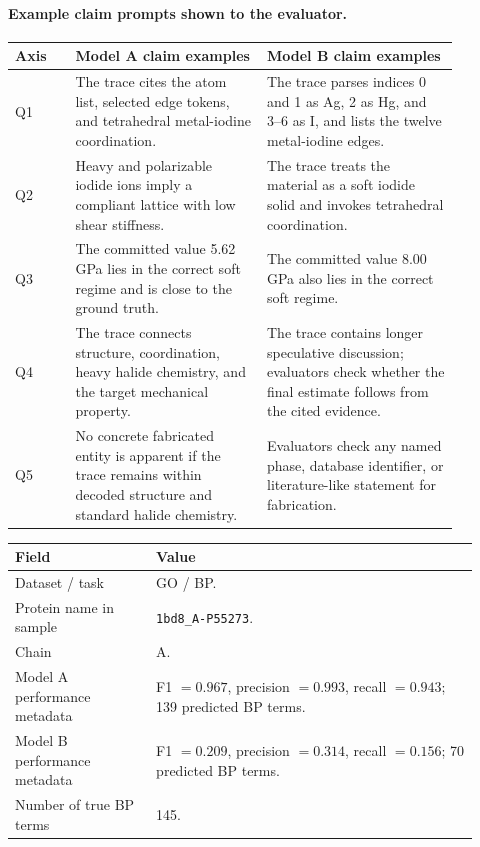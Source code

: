 \begin{appendices}
\paragraph{Example claim prompts shown to the evaluator.}
\begin{longtable}{P{0.12\linewidth}P{0.38\linewidth}P{0.38\linewidth}}
\toprule
\textbf{Axis} & \textbf{Model A claim examples} & \textbf{Model B claim examples} \\
\midrule
Q1 & The trace cites the atom list, selected edge tokens, and tetrahedral metal-iodine coordination. &
The trace parses indices 0 and 1 as Ag, 2 as Hg, and 3--6 as I, and lists the twelve metal-iodine edges. \\
Q2 & Heavy and polarizable iodide ions imply a compliant lattice with low shear stiffness. &
The trace treats the material as a soft iodide solid and invokes tetrahedral coordination. \\
Q3 & The committed value 5.62 GPa lies in the correct soft regime and is close to the ground truth. &
The committed value 8.00 GPa also lies in the correct soft regime. \\
Q4 & The trace connects structure, coordination, heavy halide chemistry, and the target mechanical property. &
The trace contains longer speculative discussion; evaluators check whether the final estimate follows from the cited evidence. \\
Q5 & No concrete fabricated entity is apparent if the trace remains within decoded structure and standard halide chemistry. &
Evaluators check any named phase, database identifier, or literature-like statement for fabrication. \\
\bottomrule
\end{longtable}


\begin{longtable}{P{0.28\linewidth}P{0.64\linewidth}}
\toprule
\textbf{Field} & \textbf{Value} \\
\midrule
Dataset / task & GO / BP. \\
Protein name in sample & \texttt{1bd8\_A-P55273}. \\
Chain & A. \\
Model A performance metadata & F1 \(=0.967\), precision \(=0.993\), recall \(=0.943\); 139 predicted BP terms. \\
Model B performance metadata & F1 \(=0.209\), precision \(=0.314\), recall \(=0.156\); 70 predicted BP terms. \\
Number of true BP terms & 145. \\
\bottomrule
\end{longtable}


\end{appendices}

